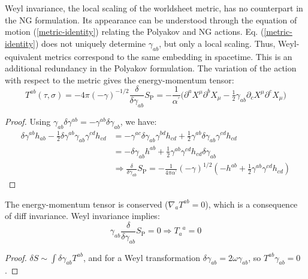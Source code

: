 \noindent
Weyl invariance, the local scaling of the worldsheet metric, has no counterpart in the NG formulation. Its appearance can be understood through the equation of motion (\ref{metric-identity}) relating the Polyakov and NG actions. Eq. (\ref{metric-identity}) does not uniquely determine $\gamma_{ab}$, but only a local scaling. Thus, Weyl-equivalent metrics correspond to the same embedding in spacetime. This is an additional redundancy in the Polyakov formulation. 
The variation of the action with respect to the metric gives the energy-momentum tensor: 
\begin{equation}
	T^{ab}(\tau,\sigma)=-4\pi(-\gamma)^{-1/2}\frac{\delta}{\delta\gamma_{ab}}S_{\mathrm{P}}=-\frac{1}{\alpha^\prime}\bigl(\partial^a X^\mu \partial^b X_\mu-\tfrac{1}{2}\gamma_{ab}\partial_c X^\mu \partial^c X_\mu\bigr)
\end{equation}
\begin{tcolorbox}[breakable]
	\begin{proof}
		Using $\gamma_{ab}\delta \gamma^{ab}=-\gamma^{ab}\delta\gamma_{ab}$, we have:
		\begin{align*}
			\delta \gamma^{ab}h_{ab}-\tfrac{1}{2}\delta \gamma^{ab}\gamma_{ab}\gamma^{cd}h_{cd} \nonumber
			&=-\gamma^{ac}\delta\gamma_{ab}\gamma^{bd}h_{cd}+\tfrac{1}{2}\gamma^{ab}\delta\gamma_{ab}\gamma^{cd}h_{cd} \nonumber\\
			&=-\delta\gamma_{ab}h^{ab}+\tfrac{1}{2}\gamma^{ab}\gamma^{cd}h_{cd}\delta\gamma_{ab} \nonumber \\
			&\Longrightarrow 
			\frac{\delta}{\delta\gamma_{ab}}S_{\mathrm{P}}=-\frac{1}{4\pi\alpha^\prime}(-\gamma)^{1/2}(-h^{ab}+\tfrac{1}{2}\gamma^{ab}\gamma^{cd}h_{cd})
		\end{align*}
	\end{proof}
\end{tcolorbox} 

The energy-momentum tensor is conserved ($\nabla_a T^{ab}=0$), which is a consequence of diff invariance. 
Weyl invariance implies: 
\begin{equation}
	\gamma_{ab}\frac{\delta}{\delta\gamma_{ab}}S_{\mathrm{P}}=0 \Rightarrow {T_a} ^a=0
\end{equation}
\begin{tcolorbox}[breakable]
	\begin{proof}
		$\delta S \sim \int \delta\gamma_{ab} T^{ab}$, and for a Weyl transformation $\delta\gamma_{ab}=2\omega \gamma_{ab}$, so $T^{ab}\gamma_{ab}=0$.
	\end{proof}
\end{tcolorbox} 

